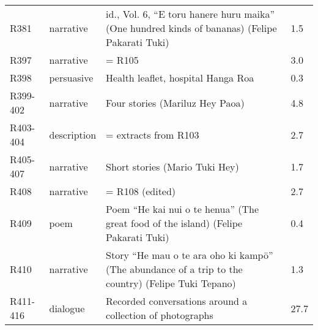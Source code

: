 {\begin{tabularx}{140mm}{p{20mm}p{18mm}QR{10mm}}
R381 & narrative & id., Vol. 6, “E toru hanere huru maika” (One hundred kinds of bananas) (Felipe Pakarati Tuki) &  1.5\\
R397 & narrative & = R105 &  3.0\\
R398 & persuasive & Health leaflet, hospital Hanga Roa &  0.3\\
R399-402 & narrative & Four stories (Mariluz Hey Paoa) &  4.8\\
R403-404 & description & = extracts from R103 &  2.7\\
R405-407 & narrative & Short stories (Mario Tuki Hey) &  1.7\\
R408 & narrative & = R108 (edited) &  2.7\\
R409 & poem & Poem “He kai nui o te henua” (The great food of the island) (Felipe Pakarati Tuki) &  0.4\\
R410 & narrative & Story “He mau o te ara oho ki kampō” (The abundance of a trip to the country) (Felipe Tuki Tepano) &  1.3\\
R411-416 & dialogue & Recorded conversations around a collection of photographs &  27.7\\
\end{tabularx}
}

